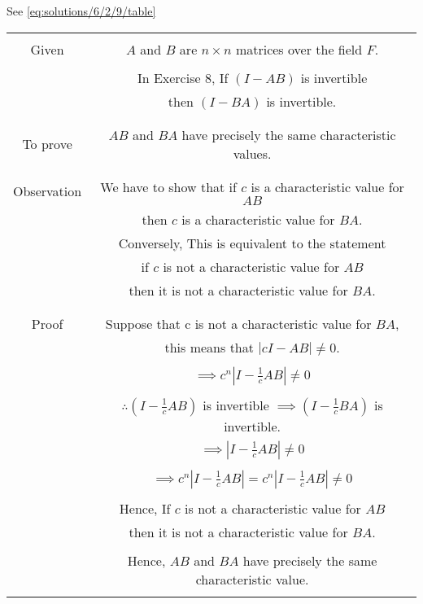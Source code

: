 See \ref{eq:solutions/6/2/9/table}
\begin{table*}[h!]
\begin{center}
\resizebox{2\columnwidth}{!}
{
\begin{tabular}{|c|c|}
\hline
& \\
Given & $A$ and $B$ are $n \times n$ matrices over the field $F$.\\
& \\
& In Exercise 8, If $(I-AB)$ is invertible\\
& then $(I-BA)$ is invertible.\\
&\\
\hline
& \\
To prove & $AB$ and $BA$ have precisely the same characteristic values.\\
& \\
\hline
&\\
Observation & We have to show that if $c$ is a characteristic value for $AB$ \\
& then $c$ is a characteristic value for $BA$.\\
& Conversely, This is equivalent to the statement\\
& if $c$ is not a characteristic value for $AB$\\
& then it is not a characteristic value for $BA$.\\
& \\
\hline
& \\
Proof  & Suppose that c is not a characteristic value for $BA$,\\
& this means that $|cI-AB|\neq0$.\\
& \\
& $\implies c^n|I-\frac{1}{c}AB|\neq0$\\
& \\
& $\therefore (I-\frac{1}{c}AB)$ is invertible $\implies (I-\frac{1}{c}BA)$ is invertible.\\
& $\implies |I-\frac{1}{c}AB|\neq0$\\
& \\
& $\implies c^n|I-\frac{1}{c}AB|=c^n|I-\frac{1}{c}AB|\neq0$\\
& \\
& Hence, If $c$ is not a characteristic value for $AB$\\
& then it is not a characteristic value for $BA$.\\
& \\
& Hence, $AB$ and $BA$ have precisely the same characteristic value.\\
& \\
\hline
\end{tabular}
}
\end{center}
\caption{}
\label{eq:solutions/6/2/9/table}
\end{table*}
